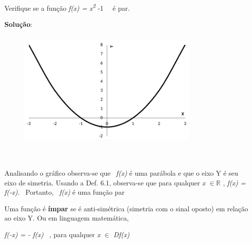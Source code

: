 \begin{texemplo}

Verifique se a função \textit{f(x) = x\textsuperscript{2}} -1~~ é par.

\textbf{ Solução}: 

\begin{figure}[H]
	\begin{Center}
		\includegraphics[width=3.53in,height=2.28in]{capitulos/outras_funcoes/media/image26.pdf}
	\end{Center}
\end{figure}

~~

Analisando o gráfico observa-se que~ \textit{f(x)} é uma parábola e que o eixo Y é seu eixo de simetria. Usando a Def. 6.1, observa-se que para qualquer \textit{x $ \in \mathbb{R} $  \textbf{ }}, \textit{f(x) = f(-x).}~ Portanto,~ \textit{f(x)} é uma função par \qedsymbol{}
\end{texemplo}

\begin{caixa}
\begin{tdefinicao}
Uma função é \textbf{ímpar} se é anti-simétrica (simetria com o sinal oposto) em relação ao eixo Y. Ou em linguagem matemática,

	\quad \textit{f(-x) = - f(x)~ }, \quad \quad para qualquer \textit{x $ \in $   Df(x)} \qedsymbol{}
\end{tdefinicao}
\end{caixa}

